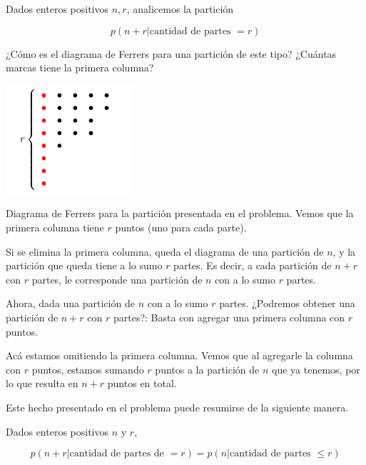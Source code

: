 \begin{prob}
    Dados enteros positivos $n, r$, analicemos la partición
    
    \[
    p(n+r|\text{cantidad de partes $= r$})
    \]
    
    ¿Cómo es el diagrama de Ferrers para una partición de este tipo? ¿Cuántas marcas tiene la primera columna?
    
    \begin{marginfigure}
        \centering
        \includegraphics[scale=0.65]{img/ferrers2.png}
        \caption{Diagrama de Ferrers para la partición presentada en el problema. Vemos que la primera columna tiene $r$ puntos (uno para cada parte).}
        \label{fig:ferrers2}
    \end{marginfigure}
    
    Si se elimina la primera columna, queda el diagrama de una partición de $n$, y la partición que queda tiene a lo sumo $r$ partes. Es decir, a cada partición de $n+r$ con $r$ partes, le corresponde una partición de $n$ con a lo sumo $r$ partes.
    
    Ahora, dada una partición de $n$ con a lo sumo $r$ partes. ¿Podremos obtener una partición de $n+r$ con $r$ partes?: Basta con agregar una primera columna con $r$ puntos.
    
    \begin{marginfigure}
        \centering
        \begin{ferrers}
                
        \end{ferrers}
        \caption{Acá estamos omitiendo la primera columna. Vemos que al agregarle la columna con $r$ puntos, estamos sumando $r$ puntos a la partición de $n$ que ya tenemos, por lo que resulta en $n+r$ puntos en total.}
    \end{marginfigure}
\end{prob}

Este hecho presentado en el problema puede resumirse de la siguiente manera.

\begin{teo}
    Dados enteros positivos $n$ y $r$,
    
    \[
    p(n+r|\text{cantidad de partes de $= r$}) = p(n|\text{cantidad de partes $\leq r$})
    \]
\end{teo}

